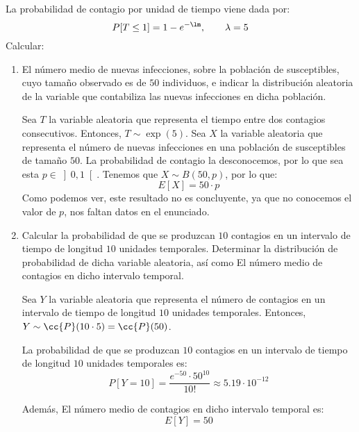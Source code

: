 \begin{ejercicio}
    La probabilidad de contagio por unidad de tiempo viene dada por:
    \begin{equation*}
        P[T \leq 1] = 1-e^{-\lm}, \qquad \lambda = 5
    \end{equation*}
    Calcular:
    \begin{enumerate}
        \item El número medio de nuevas infecciones, sobre la población de susceptibles, cuyo tamaño observado es de $50$ individuos, e indicar la distribución aleatoria de la variable que contabiliza las nuevas infecciones en dicha población.
        
        Sea $T$ la variable aleatoria que representa el tiempo entre dos contagios consecutivos. Entonces, $T\sim \exp(5)$.
        Sea $X$ la variable aleatoria que representa el número de nuevas infecciones en una población de susceptibles de tamaño $50$.
        La probabilidad de contagio la desconocemos, por lo que sea esta $p\in \left]0,1\right[$.
        Tenemos que $X\sim B(50,p)$, por lo que:
        \begin{equation*}
            E[X] = 50\cdot p
        \end{equation*}
        Como podemos ver, este resultado no es concluyente, ya que no conocemos el valor de $p$, nos faltan datos en el enunciado.

        \item Calcular la probabilidad de que se produzcan $10$ contagios en un intervalo de tiempo de longitud $10$ unidades temporales. Determinar la distribución de probabilidad de dicha variable aleatoria, así como El número medio de contagios en dicho intervalo temporal.
        
        Sea $Y$ la variable aleatoria que representa el número de contagios en un intervalo de tiempo de longitud $10$ unidades temporales. Entonces, $Y\sim \cc{P}(10\cdot 5) = \cc{P}(50)$.

        La probabilidad de que se produzcan $10$ contagios en un intervalo de tiempo de longitud $10$ unidades temporales es:
        \begin{equation*}
            P[Y=10] = \dfrac{e^{-50}\cdot 50^{10}}{10!} \approx 5.19\cdot 10^{-12}
        \end{equation*}

        Además, El número medio de contagios en dicho intervalo temporal es:
        \begin{equation*}
            E[Y] = 50
        \end{equation*}
        


\end{enumerate}
\end{ejercicio}
